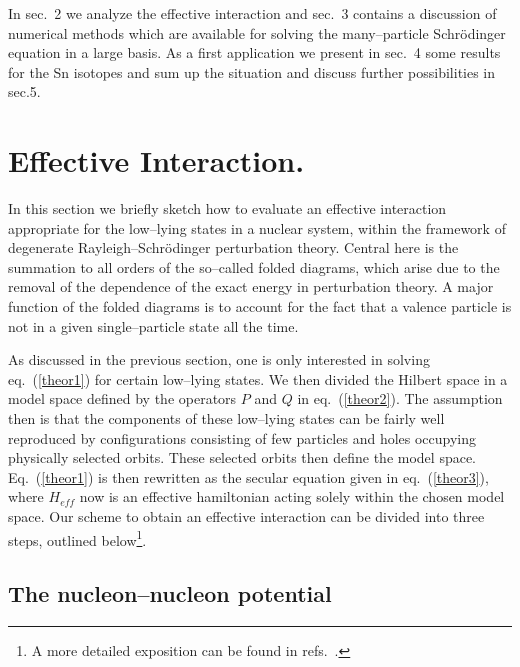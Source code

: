 In sec.~2 we analyze the effective interaction and sec.~3 contains
a discussion of numerical methods which are available
for solving the many--particle
Schr\"{o}dinger equation in a large basis. As a first application
we present in sec.~4 some results for the Sn isotopes and sum up
the situation and discuss further possibilities in sec.5.
%
%
\section{Effective Interaction.}
%
In this section we briefly sketch how to evaluate an effective
interaction appropriate for the 
low--lying states in a nuclear system, within the framework
of degenerate Rayleigh--Schr\"{o}dinger perturbation theory. Central
here is the summation to all orders of the so--called folded diagrams,
which arise due to the removal of the dependence of the exact energy
in perturbation theory. A major function of the folded diagrams
is to account for the fact that a valence particle is not
in a given single--particle state  all the time.

As discussed in the previous section,
one is only interested in solving eq.~(\ref{theor1})
for certain
low--lying states. We then divided the Hilbert space
in a model space defined by the operators $P$
and $Q$ in eq.~(\ref{theor2}).
The assumption then is that the components of these low--lying
states can be fairly well reproduced by configurations consisting
of few particles and holes occupying physically selected orbits.
These selected orbits then define the model space.
Eq.~(\ref{theor1})  is then  rewritten as the secular
equation given in eq.~(\ref{theor3}),
where $H_{eff}$  now is an effective hamiltonian acting solely
within the chosen model space.
Our scheme to obtain an effective interaction
can be divided into three steps,
outlined below\footnote{A  more detailed
exposition can be found in refs.\ \cite{ko90,hko94}.}.

\subsection{The nucleon--nucleon potential}

